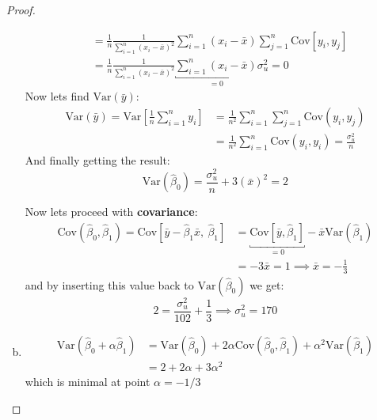 \documentclass[12pt,reqno]{amsart}
\theoremstyle{plain}
\newcommand{\V}{\text{Var}}
\newcommand{\C}{\text{Cov}}
\newcommand{\hb}{\hat\beta}
\begin{document}
\begin{proof}
\begin{enumerate}[(a)]
\begin{align*}
                                             & = \frac{1}{n} \frac{1}{\sum_{i=1}^{n} (x_i - \bar{x})^{2}} \sum_{i=1}^{n} (x_i - \bar{x}) \sum_{j=1}^{n} \C \left[ y_i, y_j \right] \\
                                             & = \frac{1}{n} \frac{1}{\sum_{i=1}^{n} (x_i - \bar{x})^{2}} \underbracket{\sum_{i=1}^{n} (x_i - \bar{x})}_{=0} \sigma^{2}_{u} = 0
              \end{align*}
              Now lets find $ \V (\bar{y}) $:
              \begin{align*}
                  \V (\bar{y}) = \V \left[ \frac{1}{n} \sum_{i=1}^{n} y_i\right] & = \frac{1}{n^{2}}\sum_{i=1}^{n}\sum_{j=1}^{n}  \C (y_i, y_j)            \\
                                                                                 & = \frac{1}{n^{2}}\sum_{i=1}^{n} \C (y_i, y_i) = \frac{\sigma_u^{2} }{n}
              \end{align*}
              And finally getting the result:
              \[
                  \V (\hb_0) = \frac{\sigma^{2}_u}{n} + 3(\bar{x})^{2} = 2
              \]

              Now lets proceed with \textbf{covariance}:
              \begin{align*}
                  \text{Cov}(\hb_0, \hb_1) = \C \left[ \bar{y} - \hb_1 \bar{x}, ~ \hb_1 \right] & = \underbracket{\C \left[ \bar{y}, \hb_1 \right]}_{=0} - \bar{x} \V (\hb_1) \\
                                                                                                & = - 3\bar{x}  = 1 \implies \bar{x} = -\frac{1}{3}
              \end{align*}
              and by inserting this value back to $ \V (\hb_0) $ we get:
              \[
                  2 = \frac{\sigma^{2}_u}{102} + \frac{1}{3} \implies \sigma^{2}_{u} = 170
              \]
        \item
              \begin{align*}
                  \V(\hb_0 + \alpha \hb_1) & = \V (\hb_0) + 2\alpha\text{Cov}(\hb_0, \hb_1) + \alpha^{2}\V (\hb_1)
                  \\&= 2 + 2\alpha +3\alpha^{2}
              \end{align*}
              which is minimal at point $ \alpha =-1/3 $

    \end{enumerate}
\end{proof}
\end{document}
